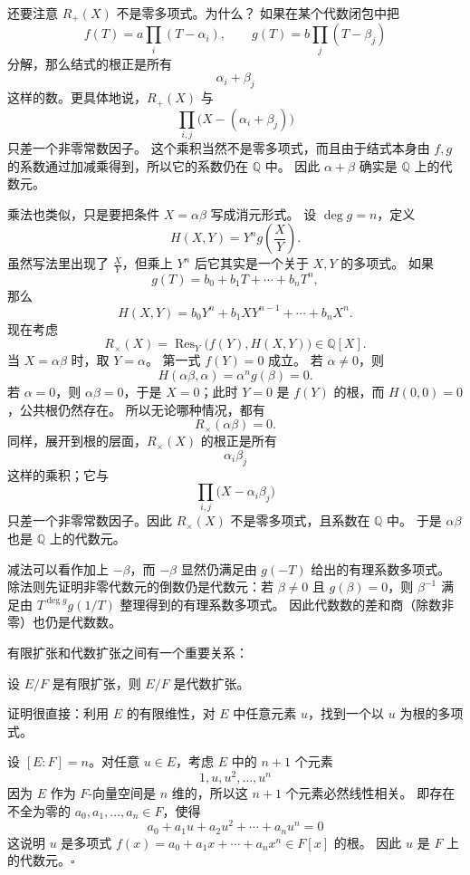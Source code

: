 还要注意 $R_+(X)$ 不是零多项式。为什么？
如果在某个代数闭包中把
\[
f(T)=a\prod_i (T-\alpha_i),\qquad g(T)=b\prod_j (T-\beta_j)
\]
分解，那么结式的根正是所有
\[
\alpha_i+\beta_j
\]
这样的数。更具体地说，$R_+(X)$ 与
\[
\prod_{i,j}\bigl(X-(\alpha_i+\beta_j)\bigr)
\]
只差一个非零常数因子。
这个乘积当然不是零多项式，而且由于结式本身由 $f,g$ 的系数通过加减乘得到，所以它的系数仍在 $\mathbb{Q}$ 中。
因此 $\alpha+\beta$ 确实是 $\mathbb{Q}$ 上的代数元。

乘法也类似，只是要把条件 $X=\alpha\beta$ 写成消元形式。
设 $\deg g=n$，定义
\[
H(X,Y)=Y^n g\!\left(\frac{X}{Y}\right).
\]
虽然写法里出现了 $\frac{X}{Y}$，但乘上 $Y^n$ 后它其实是一个关于 $X,Y$ 的多项式。
如果
\[
g(T)=b_0+b_1T+\cdots+b_nT^n,
\]
那么
\[
H(X,Y)=b_0Y^n+b_1XY^{n-1}+\cdots+b_nX^n.
\]
现在考虑
\[
R_\times(X)=\operatorname{Res}_Y\bigl(f(Y),H(X,Y)\bigr)\in\mathbb{Q}[X].
\]
当 $X=\alpha\beta$ 时，取 $Y=\alpha$。
第一式 $f(Y)=0$ 成立。
若 $\alpha\neq 0$，则
\[
H(\alpha\beta,\alpha)=\alpha^n g(\beta)=0.
\]
若 $\alpha=0$，则 $\alpha\beta=0$，于是 $X=0$；此时 $Y=0$ 是 $f(Y)$ 的根，而 $H(0,0)=0$，公共根仍然存在。
所以无论哪种情况，都有
\[
R_\times(\alpha\beta)=0.
\]
同样，展开到根的层面，$R_\times(X)$ 的根正是所有
\[
\alpha_i\beta_j
\]
这样的乘积；它与
\[
\prod_{i,j}\bigl(X-\alpha_i\beta_j\bigr)
\]
只差一个非零常数因子。因此 $R_\times(X)$ 不是零多项式，且系数在 $\mathbb{Q}$ 中。
于是 $\alpha\beta$ 也是 $\mathbb{Q}$ 上的代数元。

减法可以看作加上 $-\beta$，而 $-\beta$ 显然仍满足由 $g(-T)$ 给出的有理系数多项式。
除法则先证明非零代数元的倒数仍是代数元：若 $\beta\neq0$ 且 $g(\beta)=0$，则 $\beta^{-1}$ 满足由 $T^{\deg g}g(1/T)$ 整理得到的有理系数多项式。
因此代数数的差和商（除数非零）也仍是代数数。

有限扩张和代数扩张之间有一个重要关系：

\begin{theorem}[有限扩张必为代数扩张]\label{thm:finite-implies-algebraic}
设 $E/F$ 是有限扩张，则 $E/F$ 是代数扩张。
\end{theorem}

证明很直接：利用 $E$ 的有限维性，对 $E$ 中任意元素 $u$，找到一个以 $u$ 为根的多项式。

设 $[E:F] = n$。对任意 $u \in E$，考虑 $E$ 中的 $n+1$ 个元素
\[1, u, u^2, \ldots, u^n\]
因为 $E$ 作为 $F$-向量空间是 $n$ 维的，所以这 $n+1$ 个元素必然线性相关。
即存在不全为零的 $a_0, a_1, \ldots, a_n \in F$，使得
\[a_0 + a_1 u + a_2 u^2 + \cdots + a_n u^n = 0\]
这说明 $u$ 是多项式 $f(x) = a_0 + a_1 x + \cdots + a_n x^n \in F[x]$ 的根。
因此 $u$ 是 $F$ 上的代数元。$\square$

